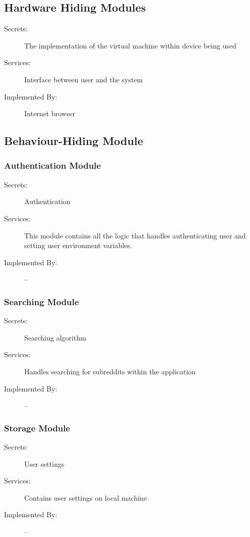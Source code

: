 \documentclass[12pt,fleqn]{article}
\begin{document}

\subsection{Hardware Hiding Modules}

\begin{description}
\item[Secrets:] The implementation of the virtual machine within device being used
\item[Services:]Interface between user and the system
\item[Implemented By:] Internet browser
\end{description}

\subsection{Behaviour-Hiding Module}

\subsubsection{Authentication Module}
\begin{description}
\item[Secrets:] Authentication
\item[Services:] This module contains all the logic that handles authenticating user and setting user environment variables. 
\item[Implemented By:] --
\end{description}

\subsubsection{Searching Module}
\begin{description}
\item[Secrets:] Searching algorithm
\item[Services:] Handles searching for subreddits within the application 
\item[Implemented By:] --
\end{description}

\subsubsection{Storage Module}
\begin{description}
\item[Secrets:] User settings
\item[Services:] Contains user settings on local machine
\item[Implemented By:] --
\end{description}
\end{document}
